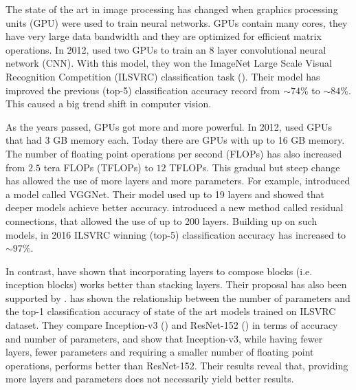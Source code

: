 
The state of the art in image processing has changed when graphics processing units (GPU) were used to train neural networks. GPUs contain many cores, they have very large data bandwidth and they are optimized for efficient matrix operations. In 2012, \cite{krizhevsky2012imagenet} used two GPUs to train an 8 layer convolutional neural network (CNN). With this model, they won the ImageNet Large Scale Visual Recognition Competition (ILSVRC) classification task (\cite{deng2012image}). Their model has improved the previous (top-5) classification accuracy record from $\sim 74\%$ to $\sim 84\%$. This caused a big trend shift in computer vision. 

As the years passed, GPUs got more and more powerful. In 2012, \cite{krizhevsky2012imagenet} used GPUs that had 3 GB memory each. Today there are GPUs with up to 16 GB memory. The number of floating point operations per second (FLOPs) has also increased from $2.5$ tera FLOPs (TFLOPs) to $12$ TFLOPs. This gradual but steep change has allowed the use of more layers and more parameters. For example, \cite{Simonyan:2014aa} introduced a model called VGGNet. Their model used up to 19 layers and showed that deeper models achieve better accuracy. \cite{He:2015aa} introduced a new method called residual connections, that allowed the use of up to 200 layers. Building up on such models, in 2016 ILSVRC winning (top-5) classification accuracy has increased to $\sim 97\%$. 

In contrast, \cite{Szegedy:2014aa} have shown that incorporating layers to compose blocks (i.e. inception blocks) works better than stacking layers. Their proposal has also been supported by \cite{Canziani:2016aa}. \cite{Canziani:2016aa} has shown the relationship between the number of parameters and the top-1 classification accuracy of state of the art models trained on ILSVRC dataset. They compare Inception-v3 (\cite{Szegedy_2016_CVPR}) and ResNet-152 (\cite{He:2015aa}) in terms of accuracy and number of parameters, and show that Inception-v3, while having fewer layers, fewer parameters and requiring a smaller number of floating point operations, performs better than ResNet-152. Their results reveal that, providing more layers and parameters does not necessarily yield better results.


